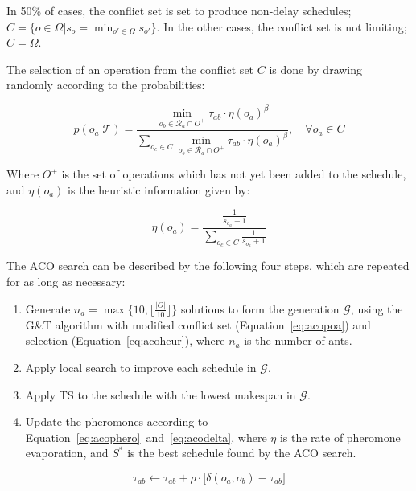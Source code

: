 \documentclass[paper=a4, fontsize=9pt]{scrartcl}
\begin{document}
\begin{multicols}{2}
In 50\% of cases, the conflict set is set to produce non-delay schedules; $C = \{o \in \Omega \vert s_o = \min_{o' \in \Omega} s_{o'}\}$. In the other cases, the conflict set is not limiting; $C = \Omega$.

The selection of an operation from the conflict set $C$ is done by drawing randomly according to the probabilities:

\begin{equation}
p(o_a \vert \mathcal{T}) = \frac
{
    \min_{o_b \in \mathcal{R}_a \cap O^{+}} \tau_{ab} \cdot \eta(o_a)^\beta
}
{
    \sum_{o_c \in C} \min_{o_b \in \mathcal{R}_a \cap O^{+}} \tau_{ab} \cdot \eta(o_a)^\beta
}, \quad \forall o_a \in C
\label{eq:acopoa}
\end{equation}

Where $O^{+}$ is the set of operations which has not yet been added to the schedule, and $\eta(o_a)$ is the heuristic information given by:

\begin{equation}
\eta(o_a) = \frac
{
    \frac{1}{s_{o_a} + 1}
}
{
    \sum_{o_c \in C} \frac{1}{s_{o_a} + 1}
}
\label{eq:acoheur}
\end{equation}

The \ac{ACO} search can be described by the following four steps, which are repeated for as long as necessary:

\begin{enumerate}
    \item Generate $n_a = \max \Big\{ 10, \big\lfloor \frac{\vert O \vert}{10} \big\rfloor \Big\}$ solutions to form the generation $\mathcal{G}$, using the G\&T algorithm with modified conflict set (Equation~\ref{eq:acopoa}) and selection (Equation~\ref{eq:acoheur}), where $n_a$ is the number of ants.
    \item Apply local search to improve each schedule in $\mathcal{G}$.
    \item Apply \ac{TS} to the schedule with the lowest makespan in $\mathcal{G}$.
    \item Update the pheromones according to Equation~\ref{eq:acophero}~and~\ref{eq:acodelta}, where $\eta$ is the rate of pheromone evaporation, and $S^{*}$ is the best schedule found by the \ac{ACO} search.
\end{enumerate}

\begin{equation}
\tau_{ab} \gets \tau_{ab} + \rho \cdot \big[ \delta(o_a, o_b) - \tau_{ab} \big]
\label{eq:acophero}
\end{equation}


\end{multicols}
\end{document}
